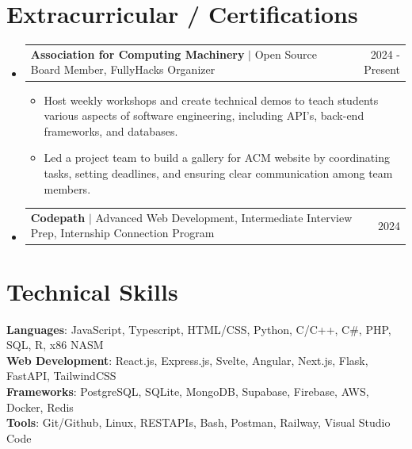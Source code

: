 \documentclass[letterpaper,11pt]{article}
\makeatletter
\newcommand{\resumeItem}[1]{
  \item\small{
    {#1 \vspace{-2pt}}
  }
}
\newcommand{\resumeProjectHeading}[2]{
    \item
    \begin{tabular*}{0.97\textwidth}{l@{\extracolsep{\fill}}r}
      \small#1 & #2 \\
    \end{tabular*}\vspace{-7pt}
}
\newcommand{\resumeSubHeadingListStart}{\begin{itemize}[leftmargin=0.1in, label={}]}
\newcommand{\resumeSubHeadingListEnd}{\end{itemize}}
\newcommand{\resumeItemListStart}{\begin{itemize}}
\newcommand{\resumeItemListEnd}{\end{itemize}\vspace{-5pt}}
\makeatother
\begin{document}
\section{Extracurricular / Certifications }
    \resumeSubHeadingListStart
        \resumeProjectHeading
          {{\textbf{{Association for Computing Machinery}}} $|$ {Open Source Board Member, FullyHacks Organizer }} {2024 - Present}
          \resumeItemListStart
            \resumeItem{Host weekly workshops and create technical demos to teach students various aspects of software engineering, including API's, back-end frameworks, and databases.}
            \resumeItem{Led a project team to build a gallery for ACM website by coordinating tasks, setting deadlines, and ensuring clear communication among team members.}
          \resumeItemListEnd
        \resumeProjectHeading
          {{\textbf{{Codepath}}} $|$ {Advanced Web Development, Intermediate Interview Prep, Internship Connection Program}} {2024}
    \resumeSubHeadingListEnd

\section{Technical Skills}
 \begin{itemize}[leftmargin=0.1in, label={}]
    \small{\item{
     \textbf{Languages}{: JavaScript, Typescript, HTML/CSS, Python, C/C++, C\#, PHP, SQL, R, x86 NASM} \\
     \textbf{Web Development}{: React.js, Express.js, Svelte, Angular, Next.js, Flask, FastAPI, TailwindCSS} \\
     \textbf{Frameworks}{: PostgreSQL, SQLite, MongoDB, Supabase, Firebase, AWS, Docker, Redis } \\
     \textbf{Tools}{: Git/Github, Linux, RESTAPIs, Bash, Postman, Railway, Visual Studio Code}
    }}
 \end{itemize}
 
        


\end{document}
